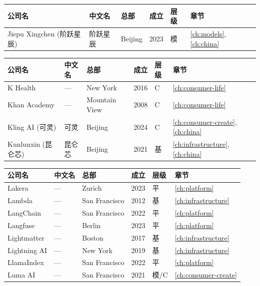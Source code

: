 \bigskip

\nopagebreak
\begin{tabularx}{\textwidth}{@{}l X l l l l@{}}
\toprule
\rowcolor{figLightGray}
\textbf{公司名} & \textbf{中文名} & \textbf{总部} & \textbf{成立} & \textbf{层级} & \textbf{章节} \\
\midrule
Jiepu Xingchen (阶跃星辰) & 阶跃星辰 & Beijing    & 2023 & 模   & \ref{ch:models}, \ref{ch:china} \\
\bottomrule
\end{tabularx}

\bigskip

\nopagebreak
\begin{tabularx}{\textwidth}{@{}l X l l l l@{}}
\toprule
\rowcolor{figLightGray}
\textbf{公司名} & \textbf{中文名} & \textbf{总部} & \textbf{成立} & \textbf{层级} & \textbf{章节} \\
\midrule
K Health            & ---             & New York      & 2016 & C    & \ref{ch:consumer-life} \\
Khan Academy        & ---             & Mountain View & 2008 & C    & \ref{ch:consumer-life} \\
Kling AI (可灵)     & 可灵            & Beijing       & 2024 & C    & \ref{ch:consumer-create}, \ref{ch:china} \\
Kunlunxin (昆仑芯)  & 昆仑芯          & Beijing       & 2021 & 基   & \ref{ch:infrastructure}, \ref{ch:china} \\
\bottomrule
\end{tabularx}

\bigskip

\nopagebreak
\begin{tabularx}{\textwidth}{@{}l X l l l l@{}}
\toprule
\rowcolor{figLightGray}
\textbf{公司名} & \textbf{中文名} & \textbf{总部} & \textbf{成立} & \textbf{层级} & \textbf{章节} \\
\midrule
Lakera              & ---             & Zurich        & 2023 & 平   & \ref{ch:platform} \\
Lambda              & ---             & San Francisco & 2012 & 基   & \ref{ch:infrastructure} \\
LangChain           & ---             & San Francisco & 2022 & 平   & \ref{ch:platform} \\
Langfuse            & ---             & Berlin        & 2023 & 平   & \ref{ch:platform} \\
Lightmatter         & ---             & Boston        & 2017 & 基   & \ref{ch:infrastructure} \\
Lightning AI        & ---             & New York      & 2019 & 基   & \ref{ch:infrastructure} \\
LlamaIndex          & ---             & San Francisco & 2022 & 平   & \ref{ch:platform} \\
Luma AI             & ---             & San Francisco & 2021 & 模/C & \ref{ch:consumer-create} \\
\bottomrule
\end{tabularx}

